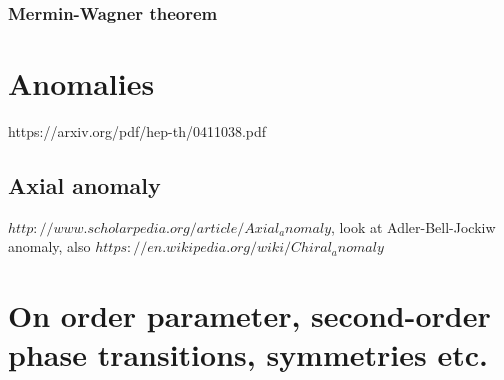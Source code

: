 \subsubsection{Mermin-Wagner theorem}
\label{subsubsec:merminwagnertheorem}



\section{Anomalies}
\label{sec:anomaly}
https://arxiv.org/pdf/hep-th/0411038.pdf
\subsection{Axial anomaly}
$http://www.scholarpedia.org/article/Axial_anomaly$, look at Adler-Bell-Jockiw  anomaly, also $https://en.wikipedia.org/wiki/Chiral_anomaly$


\section{On order parameter, second-order phase transitions, symmetries etc.}